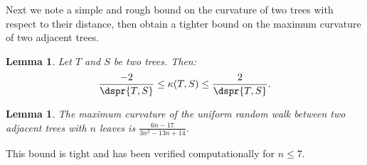 \documentclass[11pt,onecolumn,conference]{IEEEtran}
\newtheorem{lemma}[theorem]{Lemma}
\newcommand{\cuttable}[2][]{%
    \ifthenelse{\equal{#1}{}}%
		{}%
		{#1}%
}
\newcommand{\curvature}[2][]{%
    \ifthenelse{\equal{#1}{}}%
		{\kappa(#2)}%
		{\kappa_{#1}(#2)}%
}
\begin{document}
Next we note a simple and rough bound on the curvature of two trees with respect to their distance, then obtain a tighter bound on the maximum curvature of two adjacent trees.

\begin{lemma}
	\label{lem:curvature_distance_bound}
	Let $T$ and $S$ be two trees. Then:
	$$ \frac{-2}{\dspr{T,S}} \le \curvature{T,S} \le \frac{2}{\dspr{T,S}} .$$
\end{lemma}
\cuttable{
\begin{proof}
	Observe that the distance between neighbors of $T$ and $S$ is bounded between $\dspr{T,S} - 2$ and $\dspr{T,S} + 2$.
	For the curvature upper bound, we then have $\curvature{T,S} \le 1 - \frac{\dspr{T,S} - 2}{\dspr{T,S}} = \frac{2}{\dspr{T,S}}$.
	The lower bound follows similarly.
\end{proof}
}

\begin{lemma}
	The maximum curvature of the uniform random walk between two adjacent trees with $n$ leaves is $\frac{6n-17}{3n^2-13n+14}$.
\end{lemma}
\cuttable{
\begin{proof}
The maximum curvature between adjacent trees $T$ and $S$ occurs when their neighborhoods have maximum overlap and all other tree pairs are at distance 1.
By Lemma~\ref{lem:shared_neighbors} the maximum overlap is $6n-17$.
The amount of overlapping mass in the shared neighbors of $T$ and $S$ is thus $\frac{6n-17}{\max(\degree{T},\degree{S})}$.
The minimum mass transfer cost is thus $1 - \frac{6n-17}{\max(\degree{T},\degree{S})}$.
This is minimized when $\degree{T}=\degree{S}$ are as small as possible, that is $T,S$ are ladders and $\degree{T} = 3n^2 - 13n + 14$.

The maximum curvature is thus $1 - \frac{\degree{T} - (6n-17)}{\degree{T}} = \frac{6n - 17}{\degree{T}}= \frac{6n-17}{3n^2-13n+14}$.
\end{proof}
}
This bound is tight and has been verified computationally for $n \le 7$.
\end{document}
